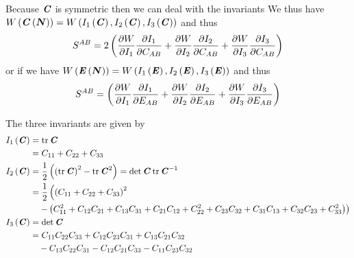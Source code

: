 Because $\boldsymbol{\mathit{C}}$ is symmetric then we can deal with the invariants \ie
We thus have
$ W\left(  \boldsymbol{\mathit{C}}\left( \boldsymbol{N} \right)  \right) = W\left(  I_{1}\left( \boldsymbol{\mathit{C}} \right) , I_{2}\left( \boldsymbol{\mathit{C}} \right) , I_{3}\left( \boldsymbol{\mathit{C}} \right)  \right) $ and
thus
\begin{equation}
  S^{AB}=2\left(  \dfrac{\partial W}{\partial I_{1}}  \dfrac{\partial I_{1}}{\partial C_{AB}} + \dfrac{\partial W}{\partial I_{2}}  \dfrac{\partial I_{2}}{\partial C_{AB}} + \dfrac{\partial W}{\partial I_{3}}  \dfrac{\partial I_{3}}{\partial C_{AB}}  \right)
\end{equation}
or if we have
$ W\left(  \boldsymbol{\mathit{E}}\left( \boldsymbol{N} \right)  \right) = W\left(  I_{1}\left( \boldsymbol{\mathit{E}} \right) , I_{2}\left( \boldsymbol{\mathit{E}} \right) , I_{3}\left( \boldsymbol{\mathit{E}} \right)  \right) $ and
thus
\begin{equation}
  S^{AB}=\left(  \dfrac{\partial W}{\partial I_{1}}  \dfrac{\partial I_{1}}{\partial E_{AB}} + \dfrac{\partial W}{\partial I_{2}}  \dfrac{\partial I_{2}}{\partial E_{AB}} + \dfrac{\partial W}{\partial I_{3}}  \dfrac{\partial I_{3}}{\partial E_{AB}}  \right)
\end{equation}

The three invariants are given by
\begin{equation}
  \begin{split}
     I_{1}\left( \boldsymbol{\mathit{C}} \right)  &= \operatorname{tr}\boldsymbol{\mathit{C}} \\
    &= C_{11} + C_{22} + C_{33} \\
     I_{2}\left( \boldsymbol{\mathit{C}} \right)  &=
    \dfrac{1}{2}\left( \left( \operatorname{tr}\boldsymbol{\mathit{C}} \right)^{2}-\operatorname{tr}\boldsymbol{\mathit{C}}^{2} \right)
    = \det\boldsymbol{\mathit{C}}\operatorname{tr}{\boldsymbol{\mathit{C}}}^{-1}\\
    &=
    \dfrac{1}{2}\left(\left( C_{11}+C_{22}+C_{33} \right)^{2}\right. \\
      & \quad\left.-\left( C_{11}^{2}+C_{12}C_{21}+C_{13}C_{31}+
        C_{21}C_{12}+C_{22}^{2}+C_{23}C_{32}+C_{31}C_{13}+C_{32}C_{23}+C_{33}^{2} \right)\right) \\
     I_{3}\left( \boldsymbol{\mathit{C}} \right)  &= \det{\ensuremath{\boldsymbol{\mathit{C}}}} \\
    &=C_{11}C_{22}C_{33}+C_{12}C_{23}C_{31}+C_{13}C_{21}C_{32}\\
    &\quad-C_{13}C_{22}C_{31}-C_{12}C_{21}C_{33}-C_{11}C_{23}C_{32}
  \end{split}
\end{equation}

